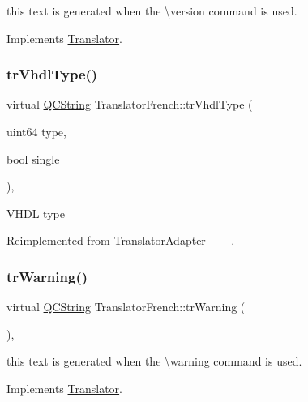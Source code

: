 this text is generated when the \textbackslash{}version command is used. 

Implements \mbox{\hyperlink{class_translator}{Translator}}.

\mbox{\label{class_translator_french_a2a5ccf040fb215dad80e277ba35d2ce6}} 
\subsubsection{\texorpdfstring{trVhdlType()}{trVhdlType()}}
{\footnotesize\ttfamily virtual \mbox{\hyperlink{class_q_c_string}{Q\+C\+String}} Translator\+French\+::tr\+Vhdl\+Type (\begin{DoxyParamCaption}\item[{uint64}]{type,  }\item[{bool}]{single }\end{DoxyParamCaption})\hspace{0.3cm}{\ttfamily [inline]}, {\ttfamily [virtual]}}

V\+H\+DL type 

Reimplemented from \mbox{\hyperlink{class_translator_adapter__1__8__15}{Translator\+Adapter\+\_\+\_\+\_}}.

\mbox{\label{class_translator_french_a9bc54ffd2edcd6fd7ba093a06b351170}} 
\subsubsection{\texorpdfstring{trWarning()}{trWarning()}}
{\footnotesize\ttfamily virtual \mbox{\hyperlink{class_q_c_string}{Q\+C\+String}} Translator\+French\+::tr\+Warning (\begin{DoxyParamCaption}{ }\end{DoxyParamCaption})\hspace{0.3cm}{\ttfamily [inline]}, {\ttfamily [virtual]}}

this text is generated when the \textbackslash{}warning command is used. 

Implements \mbox{\hyperlink{class_translator}{Translator}}.

\mbox{\label{class_translator_french_a14bcdae3474f02917a63df11e33b68b6}} 
